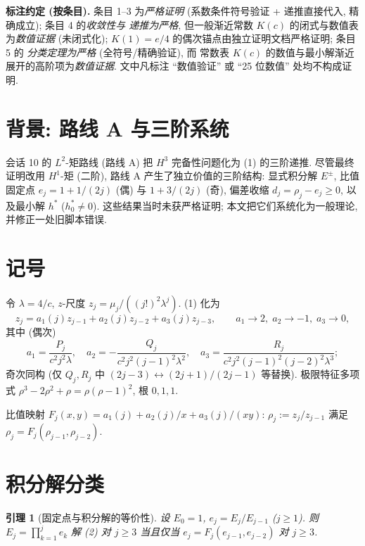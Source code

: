 \documentclass[UTF8]{ctexart}
\newtheorem{lemma}[theorem]{引理}
\begin{document}
\medskip
\noindent\textbf{标注约定 (按条目).} 条目 1--3 为\emph{严格证明}
(系数条件符号验证 + 递推直接代入, 精确成立); 条目 4 的\emph{收敛性与
递推为严格}, 但一般渐近常数 $K(c)$ 的闭式与数值表为\emph{数值证据}
(未闭式化); $K(1)=e/4$ 的偶次锚点由独立证明文档严格证明; 条目 5 的
\emph{分类定理为严格} (全符号/精确验证), 而
常数表 $K(c)$ 的数值与最小解渐近展开的高阶项为\emph{数值证据}.
文中凡标注 ``数值验证'' 或 ``25 位数值'' 处均不构成证明.

\tableofcontents

\section{背景: 路线 A 与三阶系统}

会话 10 的 $L^2$-矩路线 (路线 A) 把 $H^3$ 完备性问题化为 (1) 的三阶递推.
尽管最终证明改用 $H^1$-矩 (二阶), 路线 A 产生了独立价值的三阶结构:
显式积分解 $E^\pm$, 比值固定点 $e_j = 1 + 1/(2j)$ (偶) 与 $1 + 3/(2j)$ (奇),
偏差收缩 $d_j = \rho_j - e_j \geq 0$, 以及最小解 $h^*$ ($h^*_0 \neq 0$).
这些结果当时未获严格证明; 本文把它们系统化为一般理论, 并修正一处旧脚本错误.

\section{记号}

令 $\lambda = 4/c$, $z$-尺度 $z_j = \mu_j/((j!)^2 \lambda^j)$. (1) 化为
\begin{equation}
	z_j = a_1(j) z_{j-1} + a_2(j) z_{j-2} + a_3(j) z_{j-3},
	\qquad a_1 \to 2,\; a_2 \to -1,\; a_3 \to 0,
\end{equation}
其中 (偶次)
\[
	a_1 = \frac{P_j}{c^2 j^2 \lambda},\quad
	a_2 = -\frac{Q_j}{c^2 j^2 (j-1)^2 \lambda^2},\quad
	a_3 = \frac{R_j}{c^2 j^2 (j-1)^2 (j-2)^2 \lambda^3};
\]
奇次同构 (仅 $Q_j, R_j$ 中 $(2j-3) \leftrightarrow (2j+1)/(2j-1)$ 等替换).
极限特征多项式 $\rho^3 - 2\rho^2 + \rho = \rho(\rho-1)^2$, 根 $0, 1, 1$.

比值映射 $F_j(x,y) = a_1(j) + a_2(j)/x + a_3(j)/(xy)$:
$\rho_j := z_j/z_{j-1}$ 满足 $\rho_j = F_j(\rho_{j-1}, \rho_{j-2})$.

\section{积分解分类}

\begin{lemma}[固定点与积分解的等价性]\label{lem:fp}
	设 $E_0 = 1$, $e_j = E_j/E_{j-1}$ ($j \geq 1$). 则 $E_j = \prod_{k=1}^j e_k$
	解 (2) 对 $j \geq 3$ 当且仅当 $e_j = F_j(e_{j-1}, e_{j-2})$ 对 $j \geq 3$.
\end{lemma}
\end{document}

